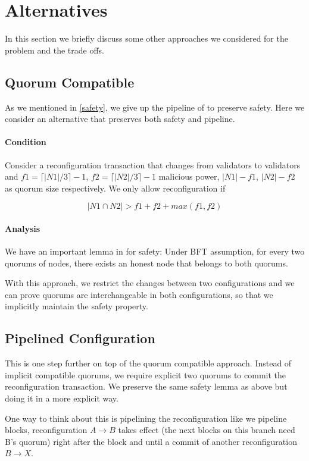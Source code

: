 \section{Alternatives} \label{alternatives}
In this section we briefly discuss some other approaches we considered for the problem and the trade offs.

\subsection{Quorum Compatible}
As we mentioned in \ref{safety}, we give up the pipeline of \LBFT to preserve safety. Here we consider an alternative that preserves
both safety and pipeline.

\paragraph{Condition}

Consider a reconfiguration transaction that changes from validators  to validators  and $f1=\lceil|N1|/3\rceil-1$,
$f2=\lceil|N2|/3\rceil-1$ malicious power, $|N1|-f1$,  $|N2|-f2$ as quorum size respectively. We only allow reconfiguration if

\begin{equation}
|N1 \cap N2| > f1 + f2 + max(f1, f2)
\end{equation}

\paragraph{Analysis}
We have an important lemma in \LBFT for safety: Under BFT assumption, for every two quorums of nodes, there exists an honest node that
belongs to both quorums.

With this approach, we restrict the changes between two configurations and we can prove quorums are interchangeable in both configurations,
so that we implicitly maintain the safety property.

\subsection{Pipelined Configuration}
This is one step further on top of the quorum compatible approach. Instead of implicit compatible quorums, we require explicit two quorums
to commit the reconfiguration transaction. We preserve the same safety lemma as above but doing it in a more explicit way.

One way to think about this is pipelining the reconfiguration like we pipeline blocks, reconfiguration $A\rightarrow B$ takes effect
(the next blocks on this branch need B’s quorum) right after the block and until a commit of another reconfiguration $B\rightarrow X$.

